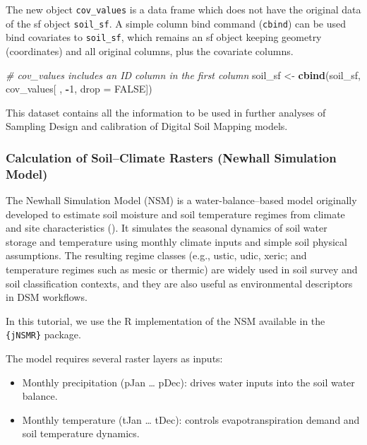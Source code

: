\documentclass[
  10pt,
  b5paper,
  oneside]{book}
\newenvironment{Shaded}{\begin{snugshade}}{\end{snugshade}}
\newcommand{\AttributeTok}[1]{\textcolor[rgb]{0.13,0.29,0.53}{#1}}
\newcommand{\CommentTok}[1]{\textcolor[rgb]{0.56,0.35,0.01}{\textit{#1}}}
\newcommand{\ConstantTok}[1]{\textcolor[rgb]{0.56,0.35,0.01}{#1}}
\newcommand{\DecValTok}[1]{\textcolor[rgb]{0.00,0.00,0.81}{#1}}
\newcommand{\FunctionTok}[1]{\textcolor[rgb]{0.13,0.29,0.53}{\textbf{#1}}}
\newcommand{\NormalTok}[1]{#1}
\newcommand{\OtherTok}[1]{\textcolor[rgb]{0.56,0.35,0.01}{#1}}
\newcommand{\SpecialCharTok}[1]{\textcolor[rgb]{0.81,0.36,0.00}{\textbf{#1}}}
\begin{document}
The new object \texttt{cov\_values} is a data frame which does not have the original data of the sf object \texttt{soil\_sf}. A simple column bind command (\texttt{cbind}) can be used bind covariates to \texttt{soil\_sf}, which remains an sf object keeping geometry (coordinates) and all original columns, plus the covariate columns.

\begin{Shaded}
\begin{Highlighting}[]
\CommentTok{\# cov\_values includes an ID column in the first column}
\NormalTok{soil\_sf }\OtherTok{\textless{}{-}} \FunctionTok{cbind}\NormalTok{(soil\_sf, cov\_values[ , }\SpecialCharTok{{-}}\DecValTok{1}\NormalTok{, }\AttributeTok{drop =} \ConstantTok{FALSE}\NormalTok{])}
\end{Highlighting}
\end{Shaded}

This dataset contains all the information to be used in further analyses of Sampling Design and calibration of Digital Soil Mapping models.

\subsubsection{Calculation of Soil--Climate Rasters (Newhall Simulation Model)}\label{calculation-of-soilclimate-rasters-newhall-simulation-model}

The Newhall Simulation Model (NSM) is a water-balance--based model originally developed to estimate soil moisture and soil temperature regimes from climate and site characteristics (). It simulates the seasonal dynamics of soil water storage and temperature using monthly climate inputs and simple soil physical assumptions. The resulting regime classes (e.g., ustic, udic, xeric; and temperature regimes such as mesic or thermic) are widely used in soil survey and soil classification contexts, and they are also useful as environmental descriptors in DSM workflows.

In this tutorial, we use the R implementation of the NSM available in the \texttt{\{jNSMR\}} package.

The model requires several raster layers as inputs:

\begin{itemize}
\item
  Monthly precipitation (pJan \ldots{} pDec): drives water inputs into the soil water balance.
\item
  Monthly temperature (tJan \ldots{} tDec): controls evapotranspiration demand and soil temperature dynamics.
\end{itemize}
\end{document}
